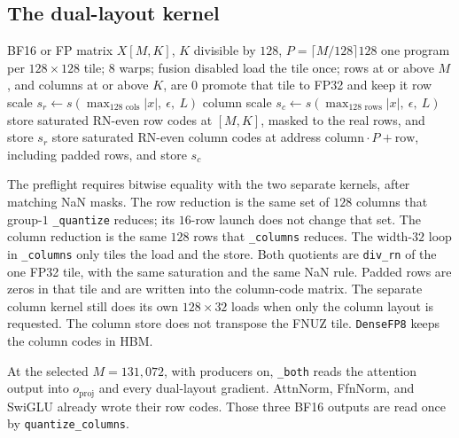 \documentclass[11pt]{article}
\DeclareRobustCommand{\code}[1]{\texttt{#1}}
\begin{document}
\subsection{The dual-layout kernel}

\begin{algorithm}[t]
\caption{\code{\_both}: one load of the \(128\times 128\) tile, then both FNUZ stores.}
\label{alg:both}
\begin{algorithmic}[1]
\Require BF16 or FP matrix \(X[M,K]\), \(K\) divisible by \(128\), \(P=\lceil M/128\rceil 128\)
\State one program per \(128\times 128\) tile; \(8\) warps; fusion disabled
\State load the tile once; rows at or above \(M\), and columns at or above \(K\), are \(0\)
\State promote that tile to FP32 and keep it
\State row scale \(s_r \leftarrow s(\max_{128\text{ cols}}|x|,\ \epsilon,\ L)\)
\State column scale \(s_c \leftarrow s(\max_{128\text{ rows}}|x|,\ \epsilon,\ L)\)
\State store saturated RN-even row codes at \([M,K]\), masked to the real rows, and store \(s_r\)
\State store saturated RN-even column codes at address \(\mathrm{column}\cdot P+\mathrm{row}\), including padded rows, and store \(s_c\)
\end{algorithmic}
\end{algorithm}

The preflight requires bitwise equality with the two separate kernels, after
matching NaN masks. The row reduction is the same set of \(128\) columns that
group-\(1\) \code{\_quantize} reduces; its \(16\)-row launch does not change
that set. The column reduction is the same \(128\) rows that \code{\_columns}
reduces. The width-\(32\) loop in \code{\_columns} only tiles the load and
the store. Both quotients are \code{div\_rn} of the one FP32 tile, with the
same saturation and the same NaN rule. Padded rows are zeros in that tile
and are written into the column-code matrix. The separate column kernel
still does its own \(128\times 32\) loads when only the column layout is
requested. The column store does not transpose the FNUZ tile.
\code{DenseFP8} keeps the column codes in HBM.

At the selected \(M=131{,}072\), with producers on, \code{\_both} reads the
attention output into \(o_{\mathrm{proj}}\) and every dual-layout gradient.
AttnNorm, FfnNorm, and SwiGLU already wrote their row codes. Those three
BF16 outputs are read once by \code{quantize\_columns}.
\end{document}
